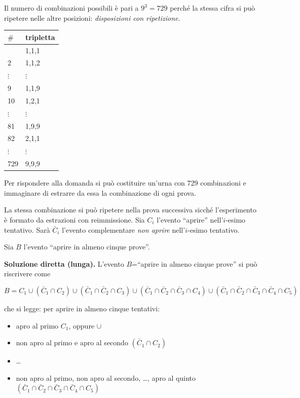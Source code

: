 \documentclass[
  11pt,
]{book}
\providecommand{\tightlist}{%
  \setlength{\itemsep}{0pt}\setlength{\parskip}{0pt}}
\theoremstyle{mytheoremstyle}
\theoremstyle{mydefstyle}
\newenvironment{sol}
  {
  \begin{tcolorbox}[enhanced,breakable,arc=0.1mm,boxrule=1pt,colback=white,colframe=iblue,
  title=\bf \fontfamily{lmss}\selectfont \hspace{.5 cm} Soluzione,drop fuzzy shadow]

}{
\end{tcolorbox}
  }
\begin{document}
\begin{sol}
Il numero di combinazioni possibili è pari a \(9^{3}= 729\)
perché la stessa cifra si può ripetere nelle altre posizioni:
\emph{disposizioni con ripetizione}.

\begin{longtable}[]{@{}ll@{}}
\toprule\noalign{}
\(\#\) & tripletta \\
\midrule\noalign{}
\endhead
\bottomrule\noalign{}
\endlastfoot
1 & 1,1,1 \\
2 & 1,1,2 \\
\(\vdots\) & \(\vdots\) \\
9 & 1,1,9 \\
10 & 1,2,1 \\
\(\vdots\) & \(\vdots\) \\
81 & 1,9,9 \\
82 & 2,1,1 \\
\(\vdots\) & \(\vdots\) \\
729 & 9,9,9 \\
\end{longtable}

Per rispondere alla domanda si può costituire un'urna con
729 combinazioni e immaginare di estrarre da essa la
combinazione di ogni prova.

La stessa combinazione si può ripetere nella prova successiva
sicché l'esperimento è formato da estrazioni con reimmissione.
Sia \(C_{i}\) l'evento ``aprire'' nell'\(i\)-esimo tentativo.
Sarà \(\bar{C}_{i}\) l'evento complementare \emph{non aprire}
nell'\(i\)-esimo tentativo.

Sia \(B\) l'evento ``aprire in almeno cinque prove''.

\textbf{Soluzione diretta (lunga).}
L'evento \(B\)=``aprire in almeno cinque prove'' si può riscrivere come

\[
B=C_1\cup (\bar C_1\cap C_2)\cup (\bar C_1\cap \bar C_2\cap C_3) \cup (\bar C_1\cap \bar C_2\cap \bar C_3\cap C_4)\cup (\bar C_1\cap \bar C_2\cap \bar C_3\cap\bar C_4\cap C_5)
\]

che si legge: per aprire in almeno cinque tentativi:

\begin{itemize}
\tightlist
\item
  apro al primo \(C_1\), oppure \(\cup\)
\item
  non apro al primo e apro al secondo \((\bar C_1\cap C_2)\)
\item
  \ldots{}
\item
  non apro al primo, non apro al secondo, \ldots, apro al quinto \((\bar C_1\cap \bar C_2\cap \bar C_3\cap\bar C_4\cap C_5)\)
\end{itemize}


\end{sol}
\end{document}
